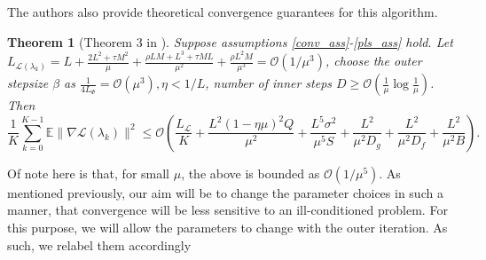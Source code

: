 \documentclass[11pt, twoside]{report}
\newtheorem{theorem}{Theorem}[section]
\begin{document}
\begin{algorithm}[]
\caption{stocBio \cite{ji2021bilevel}}
\label{alg:stocbio}
\DontPrintSemicolon
{}
\end{algorithm}


The authors also provide theoretical convergence guarantees for this algorithm.
\begin{theorem}[Theorem 3 in \cite{ji2021bilevel}] \label{thm3}
    Suppose assumptions \ref{conv_ass}-\ref{pls_ass} hold. Let $L_{\mathcal{L}(\lambda_k)} = L + \frac{2L^2 + \tau M^2}{\mu} + \frac{\rho L M + L^3 + \tau M L}{\mu^2} + \frac{\rho L^2 M}{\mu^3} = \mathcal{O}(1/\mu^3)$, choose the outer stepsize $\beta$ as $\frac{1}{4 L_\Phi} = \mathcal{O}(\mu^3), \eta < 1/L$, number of inner steps $D \geq \mathcal{O}(\frac{1}{\mu} \log{\frac{1}{\mu}})$. Then
    \[\frac{1}{K} \sum_{k=0}^{K-1} \mathbb{E} \|\nabla \mathcal{L}(\lambda_k)\|^2 \leq \mathcal{O}\left( \frac{L_{\mathcal{L}}}{K} + \frac{L^2(1-\eta \mu)^2Q}{\mu^2} + \frac{L^5 \sigma^2}{\mu^5 S} + \frac{L^2}{\mu^2 D_g} + \frac{L^2}{\mu^2 D_f} + \frac{L^2}{
    \mu^2 B} \right).\]
    
\end{theorem}
Of note here is that, for small $\mu$, the above is bounded as $\mathcal{O}(1/\mu^5)$. As mentioned previously, our aim will be to change the parameter choices in such a manner, that convergence will be less sensitive to an ill-conditioned problem. For this purpose, we will allow the parameters to change with the outer iteration. As such, we relabel them accordingly
\end{document}
